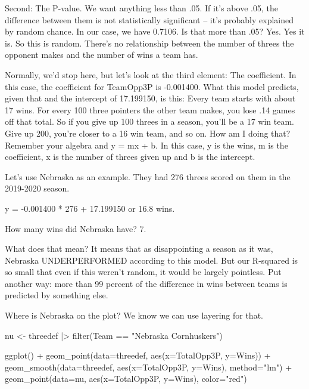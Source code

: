 \documentclass[
  letterpaper,
  DIV=11,
  numbers=noendperiod]{scrreprt}
\newenvironment{Shaded}{\begin{snugshade}}{\end{snugshade}}
\newcommand{\AttributeTok}[1]{\textcolor[rgb]{0.40,0.45,0.13}{#1}}
\newcommand{\FunctionTok}[1]{\textcolor[rgb]{0.28,0.35,0.67}{#1}}
\newcommand{\NormalTok}[1]{\textcolor[rgb]{0.00,0.23,0.31}{#1}}
\newcommand{\OtherTok}[1]{\textcolor[rgb]{0.00,0.23,0.31}{#1}}
\newcommand{\SpecialCharTok}[1]{\textcolor[rgb]{0.37,0.37,0.37}{#1}}
\newcommand{\StringTok}[1]{\textcolor[rgb]{0.13,0.47,0.30}{#1}}
\begin{document}
Second: The P-value. We want anything less than .05. If it's above .05,
the difference between them is not statistically significant -- it's
probably explained by random chance. In our case, we have 0.7106. Is
that more than .05? Yes. Yes it is. So this is random. There's no
relationship between the number of threes the opponent makes and the
number of wins a team has.

Normally, we'd stop here, but let's look at the third element: The
coefficient. In this case, the coefficient for TeamOpp3P is -0.001400.
What this model predicts, given that and the intercept of 17.199150, is
this: Every team starts with about 17 wins. For every 100 three pointers
the other team makes, you lose .14 games off that total. So if you give
up 100 threes in a season, you'll be a 17 win team. Give up 200, you're
closer to a 16 win team, and so on. How am I doing that? Remember your
algebra and y = mx + b. In this case, y is the wins, m is the
coefficient, x is the number of threes given up and b is the intercept.

Let's use Nebraska as an example. They had 276 threes scored on them in
the 2019-2020 season.

y = -0.001400 * 276 + 17.199150 or 16.8 wins.

How many wins did Nebraska have? 7.

What does that mean? It means that as disappointing a season as it was,
Nebraska UNDERPERFORMED according to this model. But our R-squared is so
small that even if this weren't random, it would be largely pointless.
Put another way: more than 99 percent of the difference in wins between
teams is predicted by something else.

Where is Nebraska on the plot? We know we can use layering for that.

\begin{Shaded}
\begin{Highlighting}[]
\NormalTok{nu }\OtherTok{\textless{}{-}}\NormalTok{ threedef }\SpecialCharTok{|\textgreater{}} \FunctionTok{filter}\NormalTok{(Team }\SpecialCharTok{==} \StringTok{"Nebraska Cornhuskers"}\NormalTok{)}
\end{Highlighting}
\end{Shaded}

\begin{Shaded}
\begin{Highlighting}[]
\FunctionTok{ggplot}\NormalTok{() }\SpecialCharTok{+} 
  \FunctionTok{geom\_point}\NormalTok{(}\AttributeTok{data=}\NormalTok{threedef, }\FunctionTok{aes}\NormalTok{(}\AttributeTok{x=}\NormalTok{TotalOpp3P, }\AttributeTok{y=}\NormalTok{Wins)) }\SpecialCharTok{+}
  \FunctionTok{geom\_smooth}\NormalTok{(}\AttributeTok{data=}\NormalTok{threedef, }\FunctionTok{aes}\NormalTok{(}\AttributeTok{x=}\NormalTok{TotalOpp3P, }\AttributeTok{y=}\NormalTok{Wins), }\AttributeTok{method=}\StringTok{"lm"}\NormalTok{) }\SpecialCharTok{+}
  \FunctionTok{geom\_point}\NormalTok{(}\AttributeTok{data=}\NormalTok{nu, }\FunctionTok{aes}\NormalTok{(}\AttributeTok{x=}\NormalTok{TotalOpp3P, }\AttributeTok{y=}\NormalTok{Wins), }\AttributeTok{color=}\StringTok{"red"}\NormalTok{)}
\end{Highlighting}
\end{Shaded}
\end{document}
